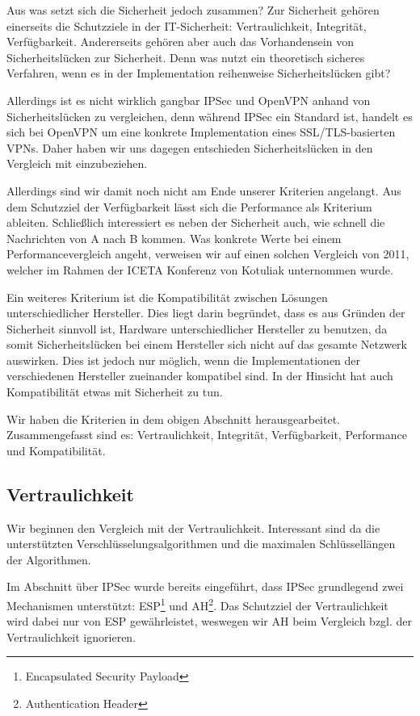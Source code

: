 \documentclass[12pt]{scrartcl}
\begin{document}
Aus was setzt sich die Sicherheit jedoch zusammen? Zur Sicherheit gehören einerseits die Schutzziele in der IT-Sicherheit: Vertraulichkeit, Integrität, Verfügbarkeit. Andererseits gehören aber auch das Vorhandensein von Sicherheitslücken zur Sicherheit. Denn was nutzt ein theoretisch sicheres Verfahren, wenn es in der Implementation reihenweise Sicherheitslücken gibt?

Allerdings ist es nicht wirklich gangbar IPSec und OpenVPN anhand von Sicherheitslücken zu vergleichen, denn während IPSec ein Standard ist\cite{Kent2005}, handelt es sich bei OpenVPN um eine konkrete Implementation eines SSL/TLS-basierten VPNs\cite{Kotuliak2011}. Daher haben wir uns dagegen entschieden Sicherheitslücken in den Vergleich mit einzubeziehen.

Allerdings sind wir damit noch nicht am Ende unserer Kriterien angelangt. Aus dem Schutzziel der Verfügbarkeit lässt sich die Performance als Kriterium ableiten. Schließlich interessiert es neben der Sicherheit auch, wie schnell die Nachrichten von A nach B kommen. Was konkrete Werte bei einem Performancevergleich angeht, verweisen wir auf einen solchen Vergleich von 2011, welcher im Rahmen der ICETA Konferenz von Kotuliak\cite{Kotuliak2011} unternommen wurde.

Ein weiteres Kriterium ist die Kompatibilität zwischen Lösungen unterschiedlicher Hersteller. Dies liegt darin begründet, dass es aus Gründen der Sicherheit sinnvoll ist, Hardware unterschiedlicher Hersteller zu benutzen, da somit Sicherheitslücken bei einem Hersteller sich nicht auf das gesamte Netzwerk auswirken. Dies ist jedoch nur möglich, wenn die Implementationen der verschiedenen Hersteller zueinander kompatibel sind. In der Hinsicht hat auch Kompatibilität etwas mit Sicherheit zu tun.

Wir haben die Kriterien in dem obigen Abschnitt herausgearbeitet. Zusammengefasst sind es: Vertraulichkeit, Integrität, Verfügbarkeit, Performance und Kompatibilität.

\subsection{Vertraulichkeit}
Wir beginnen den Vergleich mit der Vertraulichkeit. Interessant sind da die unterstützten Verschlüsselungsalgorithmen und die maximalen Schlüssellängen der Algorithmen.

Im Abschnitt über IPSec wurde bereits eingeführt, dass IPSec grundlegend zwei Mechanismen unterstützt: ESP\footnote{Encapsulated Security Payload} und AH\footnote{Authentication Header}. Das Schutzziel der Vertraulichkeit wird dabei nur von ESP gewährleistet, weswegen wir AH beim Vergleich bzgl. der Vertraulichkeit ignorieren.
\end{document}
